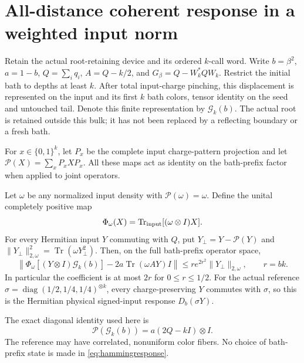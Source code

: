 
\section{All-distance coherent response in a weighted input norm}
\label{sec:hammingresponse}

Retain the actual root-retaining device and its ordered $k$-call word.
Write $b=\beta^2$, $a=1-b$, $Q=\sum_iq_i$, $A=Q-k/2$, and
$G_\beta=Q-W_k^*QW_k$. Restrict the initial bath to depths at least $k$.
After total input-charge pinching, this displacement is represented on
the input and its first $k$ bath colors, tensor identity on the seed and
untouched tail. Denote this finite representation by $\mathcal G_k(b)$.
The actual root is retained outside this bulk; it has not been replaced
by a reflecting boundary or a fresh bath.

For $x\in\{0,1\}^k$, let $P_x$ be the complete input charge-pattern
projection and let $\mathcal P(X)=\sum_xP_xXP_x$. All these maps act as
identity on the bath-prefix factor when applied to joint operators.

\begin{theorem}\label{thm:hammingresponse}
Let $\omega$ be any normalized input density with
$\mathcal P(\omega)=\omega$. Define the unital completely positive map
\[
 \Phi_\omega(X)=\operatorname{Tr}_{\rm input}[(\omega\otimes I)X].
\]
For every Hermitian input $Y$ commuting with $Q$, put
$Y_\perp=Y-\mathcal P(Y)$ and
$\|Y_\perp\|_{2,\omega}^2=\operatorname{Tr}(\omega Y_\perp^2)$.
Then, on the full bath-prefix operator space,
\begin{equation}\label{eq:hammingresponse}
 \left\|
 \Phi_\omega[(Y\otimes I)\mathcal G_k(b)]
 -2a\operatorname{Tr}(\omega AY)I
 \right\|
 \le r e^{2r^2}\|Y_\perp\|_{2,\omega},\qquad r=bk.
\end{equation}
In particular the coefficient is at most $2r$ for $0\le r\le1/2$.
For the actual reference
$\sigma=\operatorname{diag}(1/2,1/4,1/4)^{\otimes k}$, every
charge-preserving $Y$ commutes with $\sigma$, so this is the Hermitian
physical signed-input response $D_b(\sigma Y)$.

The exact diagonal identity used here is
\begin{equation}\label{eq:hammingdiagonal}
 \mathcal P(\mathcal G_k(b))=a(2Q-kI)\otimes I.
\end{equation}
The reference may have correlated, nonuniform color fibers. No choice of
bath-prefix state is made in \eqref{eq:hammingresponse}.
\end{theorem}

